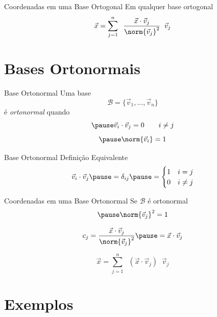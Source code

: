 \documentclass[fleqn,aspectratio=169,12pt]{beamer}
\begin{document}
\begin{frame}{Coordenadas em uma Base Ortogonal}
  Em qualquer base ortogonal
  \[
    \vec{x} = \sum_{j=1}^{n} \;\;
    \frac{\vec{x}\cdot\vec{v}_j}{\norm{\vec{v}_j}^{2}} \;\; \vec{v}_j
  \]
\end{frame}

\section{Bases Ortonormais}

\begin{frame}{Base Ortonormal}
  Uma base
  \[
   \mathcal{B} = \{\vec{v}_1, \ldots, \vec{v}_n\}
  \]
  \pause
  é \emph{ortonormal} quando
  \[
    \pause
    \vec{v}_i\cdot\vec{v}_j = 0
    \qquad
    i\neq j
  \]
  \[
    \pause
    \norm{\vec{v}_i}=1
  \]
\end{frame}

\begin{frame}{Base Ortonormal Definição Equivalente}
  \[
    \vec{v}_i\cdot\vec{v}_j
    \pause
    = \delta_{ij}
    \pause
    =
    \begin{cases}
    1 & i = j\\
    0 & i \neq j
    \end{cases}
  \]
\end{frame}

\begin{frame}{Coordenadas em uma Base Ortonormal}
  Se $\mathcal{B}$ é ortonormal
  \[
    \pause
    \norm{\vec{v}_j}^{2} = 1
  \]

  \pause
  \[
    c_j
    = \frac{\vec{x}\cdot\vec{v}_j}{\norm{\vec{v}_j}^{2}}
    \pause
    = \vec{x} \cdot \vec{v}_j
  \]

  \pause
  \[
    \vec{x} = \sum_{j=1}^{n} \;\;
    (\vec{x}\cdot\vec{v}_j) \;\; \vec{v}_j
  \]
\end{frame}

\section{Exemplos}
\end{document}
